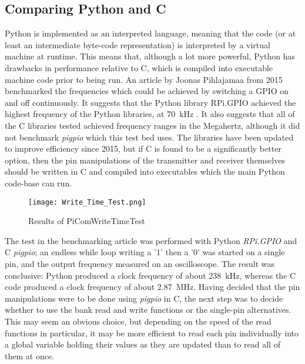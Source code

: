 \documentclass[../main.tex]{subfiles}
\begin{document}
\subsection{Comparing Python and C} \label{sec_Comparing Python and C}

Python is implemented as an interpreted language, meaning that the code (or at least an intermediate byte-code representation) is interpreted by a virtual machine at runtime.
This means that, although a lot more powerful, Python has drawbacks in performance relative to C, which is compiled into executable machine code prior to being run.
An article by Joonas Pihlajamaa from 2015 benchmarked the frequencies which could be achieved by switching a GPIO on and off continuously.
It suggests that the Python library RPi.GPIO achieved the highest frequency of the Python libraries, at \SI{70}{\kilo\hertz} \cite{web_BenchmarkingPi}.
It also suggests that all of the C libraries tested achieved frequency ranges in the Megahertz, although it did not benchmark \textit{pigpio} which this test bed uses.
The libraries have been updated to improve efficiency since 2015, but if C is found to be a significantly better option, then the pin manipulations of the transmitter and receiver themselves should be written in C and compiled into executables which the main Python code-base can run.\\

\begin{figure}[ht]
	\centering
	\texttt{[image: Write\_Time\_Test.png]}
	\caption{Results of PiCom\textunderscore Write\textunderscore Time\textunderscore Test}
	\label{fig_Write Time Test}
\end{figure}

The test in the benchmarking article was performed with Python \textit{RPi.GPIO} and C \textit{pigpio}; an endless while loop writing a '1' then a '0' was started on a single pin, and the output frequency measured on an oscilloscope.
The result was conclusive: Python produced a clock frequency of about \SI{238}{\kilo\hertz}, whereas the C code produced a clock frequency of about \SI{2.87}{\mega\hertz}.
Having decided that the pin manipulations were to be done using \textit{pigpio} in C, the next step was to decide whether to use the bank read and write functions or the single-pin alternatives.
This may seem an obvious choice, but depending on the speed of the read functions in particular, it may be more efficient to read each pin individually into a global variable holding their values as they are updated than to read all of them at once.\\
\end{document}
